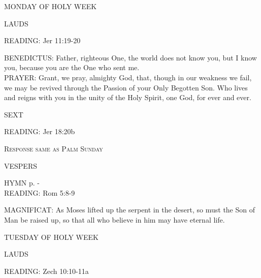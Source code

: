\begin{center}
\normalsize MONDAY OF HOLY WEEK
\end{center}

\begin{flushleft}\normalsize{\uppercase{LAUDS\\}}\end{flushleft}
\noindent\small{\uppercase{READING:}}    Jer 11:19-20 \textbf{   \\}

\noindent\small{\uppercase{BENEDICTUS:}}	Father, righteous One, the world does not know you, but I know you, because you are the One who sent me.\\

\noindent\small{\uppercase{PRAYER:}}	Grant, we pray, almighty God, that, though in our weakness we fail, we may be revived through the Passion of your Only Begotten Son. Who lives and reigns with you in the unity of the Holy Spirit, one God, for ever and ever.

\begin{flushleft}\normalsize{\uppercase{SEXT\\}}\end{flushleft}
\noindent\small READING:    Jer 18:20b

\begin{center}\textsc{Response same as Palm Sunday}\end{center}

\begin{flushleft}\normalsize{\uppercase{VESPERS\\}}\end{flushleft}
\small{\uppercase{HYMN} p. \pageref{lent:firstHymn}-\pageref{lent:lastHymn}\\}
\noindent\small{\uppercase{READING:}}    Rom 5:8-9 \textbf{   \\}

\noindent\small{\uppercase{MAGNIFICAT:}}	As Moses lifted up the serpent in the desert, so must the Son of Man be raised up, so that all who believe in him may have eternal life.\\

\begin{center}
\normalsize TUESDAY OF HOLY WEEK
\end{center}

\begin{flushleft}\normalsize{\uppercase{LAUDS\\}}\end{flushleft}
\noindent\small READING:    Zech 10:10-11a    

